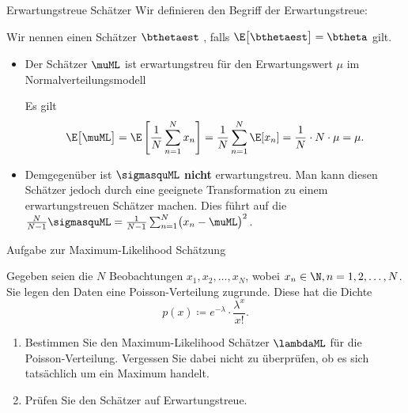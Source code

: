 \begin{frame}{Erwartungstreue Schätzer}{}
	Wir definieren den Begriff der Erwartungstreue:
	\begin{mydef}
		Wir nennen einen Schätzer $\bthetaest$ , falls $\E\bigl[ \bthetaest \bigr] = \btheta$ gilt.
	\end{mydef}
	
	\begin{itemize}
		\item Der Schätzer $\muML$ ist erwartungstreu für den Erwartungswert $\mu$
		im Normalverteilungsmodell \\ \vspace*{2mm}
		\begin{myproof}
			Es gilt
			\begin{equation*}
				\E\bigl[ \muML \bigr]
					= \E\left[ \frac{1}{N} \sum_{n=1}^N x_n \right]
					= \frac{1}{N} \sum_{n=1}^N \E[x_n]
					= \frac{1}{N} \cdot N \cdot \mu
					= \mu.
			\end{equation*}
		\end{myproof}
		\item Demgegenüber ist $\sigmasquML$ \textbf{nicht} erwartungstreu.
			Man kann diesen Schätzer jedoch durch eine geeignete Transformation
			zu einem erwartungstreuen Schätzer machen. Dies führt auf die 
			$\frac{N}{N - 1} \sigmasquML = \frac{1}{N - 1} \sum_{n=1}^N \bigl( x_n - \muML \bigr)^2$.
	\end{itemize}
\end{frame}


\begin{frame}{Aufgabe zur Maximum-Likelihood Schätzung}{}
	\begin{mytask}
		Gegeben seien die $N$ Beobachtungen $x_1, x_2, \ldots, x_N$, wobei $x_n \in \N, n = 1, 2, \ldots, N$.
		Sie legen den Daten eine Poisson-Verteilung zugrunde. Diese hat die Dichte
		\begin{equation*}
			p(x) \coloneqq e^{-\lambda} \cdot \frac{\lambda^x}{x!}.
		\end{equation*}
		
		\begin{enumerate}
			\item Bestimmen Sie den Maximum-Likelihood Schätzer $\lambdaML$ für die Poisson-Verteilung.
				Vergessen Sie dabei nicht zu überprüfen, ob es sich tatsächlich um ein Maximum handelt.
			\item Prüfen Sie den Schätzer auf Erwartungstreue.
		\end{enumerate}
	\end{mytask}
\end{frame}


